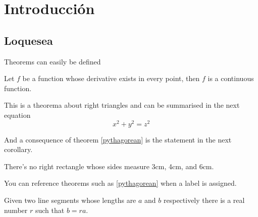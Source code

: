 \chapter{\label{ch:1-intro}Introducción} 

\section{Loquesea}
Theorems can easily be defined

\cite{latexcompanion}


\begin{theorem}
	Let $f$ be a function whose derivative exists in every point, then $f$ is 
	a continuous function.
\end{theorem}

\begin{theorem}
	\label{pythagorean}
	This is a theorema about right triangles and can be summarised in the next 
	equation 
	\[ x^2 + y^2 = z^2 \]
\end{theorem}

And a consequence of theorem \ref{pythagorean} is the statement in the next 
corollary.

\begin{corollary}
	There's no right rectangle whose sides measure 3cm, 4cm, and 6cm.
\end{corollary}

You can reference theorems such as \ref{pythagorean} when a label is assigned.

\begin{lemma}
	Given two line segments whose lengths are $a$ and $b$ respectively there is a 
	real number $r$ such that $b=ra$.
\end{lemma}
